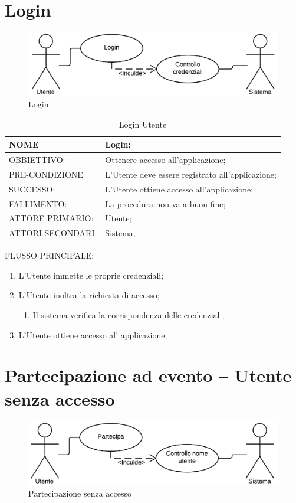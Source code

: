 \section{Login}
\begin{figure}[h!]
\centering
\includegraphics[scale=0.30]{img/use/Log.png}
\caption{Login}
\label{fig:Login}
\end{figure}
\begin{table}[H]
\begin{tabular}{p{}|p{}}
\toprule
NOME & Login;\\
\hline
OBBIETTIVO: & Ottenere accesso all'applicazione;\\
\hline
PRE-CONDIZIONE & L'Utente deve essere registrato all'applicazione;\\
\hline
SUCCESSO: & L'Utente ottiene accesso all'applicazione;\\
\hline
FALLIMENTO: & La procedura non va a buon fine;\\
\hline
ATTORE PRIMARIO: & Utente;\\
\hline
ATTORI SECONDARI: & Sistema;\\
\bottomrule
\end{tabular}
\caption{Login Utente}
\label{table:log}
\end{table}
FLUSSO PRINCIPALE:
\begin{enumerate}
\item L'Utente immette le proprie credenziali;
\item L'Utente inoltra la richiesta di accesso;
\begin{enumerate}
\item Il sistema verifica la corrispondenza delle credenziali;
\end{enumerate}
\item L'Utente ottiene accesso al' applicazione;
\end{enumerate}

\section{Partecipazione ad evento – Utente senza accesso}
\begin{figure}[h!]
\centering
\includegraphics[scale=0.30]{img/use/PartecipaSa.png}
\caption{Partecipazione senza accesso}
\label{fig:ParteSA}
\end{figure}

